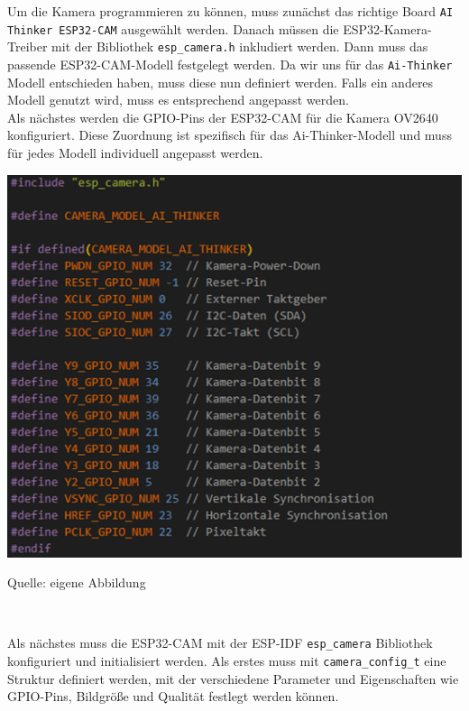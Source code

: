 \documentclass[ngerman,12pt,a4paper]{article}
\begin{document}
	Um die Kamera programmieren zu können, muss zunächst das richtige Board \texttt{AI Thinker ESP32-CAM} ausgewählt werden. Danach müssen die ESP32-Kamera-Treiber mit der Bibliothek \texttt{esp\_camera.h} inkludiert werden. Dann muss das passende ESP32-CAM-Modell festgelegt werden. Da wir uns für das \texttt{Ai-Thinker} Modell entschieden haben, muss diese nun definiert werden. Falls ein anderes Modell genutzt wird, muss es entsprechend angepasst werden. \\[0.5cm]
	Als nächstes werden die GPIO-Pins der ESP32-CAM für die Kamera OV2640 konfiguriert. Diese Zuordnung ist spezifisch für das Ai-Thinker-Modell und muss für jedes Modell individuell angepasst werden. \\[0.5cm]
	\begin{center}
		\begin{minipage}[t]{0.95\textwidth}
			\includegraphics{Pictures/kamera-setup1}
			\label{fig:Kamera-GPIO Konfiguration}
			\vspace{-10pt}
			\begin{center}
				\par\small Quelle: eigene Abbildung 
			\end{center}
		\end{minipage} \\[0.75cm]
	\end{center}
	Als nächstes muss die ESP32-CAM mit der ESP-IDF \texttt{esp\_camera} Bibliothek konfiguriert und initialisiert werden. Als erstes muss mit \texttt{camera\_config\_t} eine Struktur definiert werden, mit der verschiedene Parameter und Eigenschaften wie GPIO-Pins, Bildgröße und Qualität festlegt werden können. \\[0.5cm] 
\end{document}
